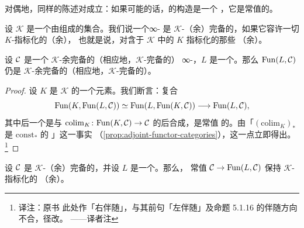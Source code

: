 \begin{remark}\label{rem:limit-adjoint-dual}
对偶地，同样的陈述对\trLimit{}成立：如果可能的话，\trLimit{}的构造是一个%
\trFunctor{}，它是常值\trFunctor{}的\trRightAdjoint{}。
\end{remark}

\begin{definition}\label{def:K-cocomplete}
设 $\mathcal{K}$ 是一个由\trSimplicialSets{}组成的集合。我们说一个∞-\trCategory{}%
是 $\mathcal{K}$-（余）完备的，如果它容许一切 $K$-指标化的（余）\trLimit{}，
也就是说，对含于 $\mathcal{K}$ 中的\trSimplicialSets{} $K$ 指标化的那些
（余）\trLimit{}。
\end{definition}

\begin{proposition}\label{prop:fun-K-cocomplete}
设 $\mathcal{C}$ 是一个 $\mathcal{K}$-余完备的（相应地，$\mathcal{K}$-完备的）
∞-\trCategory{}，$L$ 是一个\trSimplicialSet{}。那么 $\mathrm{Fun}(L, \mathcal{C})$ 仍是
$\mathcal{K}$-余完备的（相应地，$\mathcal{K}$-完备的）。
\end{proposition}

\begin{proof}
设 $K$ 是 $\mathcal{K}$ 的一个元素。我们断言：复合
\[
\mathrm{Fun}(K, \mathrm{Fun}(L, \mathcal{C})) \simeq
  \mathrm{Fun}(L, \mathrm{Fun}(K, \mathcal{C})) \longrightarrow \mathrm{Fun}(L, \mathcal{C}),
\]
其中后一个\trFunctor{}是与\trColimit{}\trFunctor{}%
$\mathrm{colim}_K\colon \mathrm{Fun}(K, \mathcal{C}) \to \mathcal{C}$ 的后合成，是常值\trFunctor{}%
的\trLeftAdjoint{}。由「$(\mathrm{colim}_K)_*$ 是 $\mathrm{const}_*$ 的%
\trLeftAdjoint{}」这一事实
（\cref{prop:adjoint-functor-categories}），这一点立即得出。\footnote{译注：原书%
此处作「右伴随」，与其前句「左伴随」及命题 5.1.16 的伴随方向不合，径改。
——译者注}
\end{proof}

\begin{corollary}\label{cor:const-preserves-K-colimits}
设 $\mathcal{C}$ 是 $\mathcal{K}$-（余）完备的，并设 $L$ 是一个\trSimplicialSet{}。那么，
常值\trFunctor{} $\mathcal{C} \to \mathrm{Fun}(L, \mathcal{C})$ 保持 $\mathcal{K}$-指标化的
（余）\trLimit{}。
\end{corollary}


